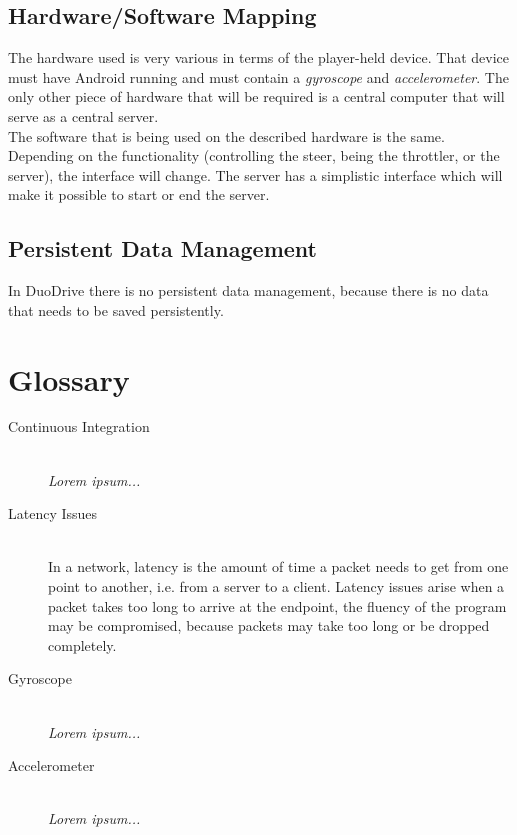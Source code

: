 \documentclass[11pt,twoside,a4paper]{article}
\begin{document}
\subsection{Hardware/Software Mapping}
The hardware used is very various in terms of the player-held device. That device must have Android running and must contain a \emph{gyroscope} and \emph{accelerometer}. The only other piece of hardware that will be required is a central computer that will serve as a central server. \\
The software that is being used on the described hardware is the same. Depending on the functionality (controlling the steer, being the throttler, or the server), the interface will change. The server has a simplistic interface which will make it possible to start or end the server.


\subsection{Persistent Data Management}
In DuoDrive there is no persistent data management, because there is no data that needs to be saved persistently.

\newpage


\section{Glossary}
\begin{description}
\item[Continuous Integration] \hfill \\
\emph{Lorem ipsum...}
\item[Latency Issues] \hfill \\
In a network, latency is the amount of time a packet needs to get from one point to another, i.e. from a server to a client. Latency issues arise when a packet takes too long to arrive at the endpoint, the fluency of the program may be compromised, because packets may take too long or be dropped completely. 
\item[Gyroscope] \hfill \\
\emph{Lorem ipsum...}
\item[Accelerometer] \hfill \\
\emph{Lorem ipsum...}
\end{description}
\end{document}
